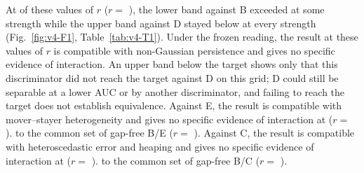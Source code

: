 At  of these values of $r$ ($r=$ ), the lower band against B exceeded  at some strength while the upper band against D stayed below  at every strength (Fig.~\ref{fig:v4-F1}, Table~\ref{tab:v4-T1}). %
Under the frozen reading, the result at these values of $r$ is compatible with non-Gaussian persistence and gives no specific evidence of interaction. %
An upper band below the target shows only that this discriminator did not reach the target against D on this grid; D could still be separable at a lower AUC or by another discriminator, and failing to reach the target does not establish equivalence. %
Against E, the result is compatible with mover--stayer heterogeneity and gives no specific evidence of interaction at   ($r=$ ).  to the common set of  gap-free B/E  ($r=$ ). %
Against C, the result is compatible with heteroscedastic error and heaping and gives no specific evidence of interaction at   ($r=$ ).  to the common set of  gap-free B/C  ($r=$ ). %


